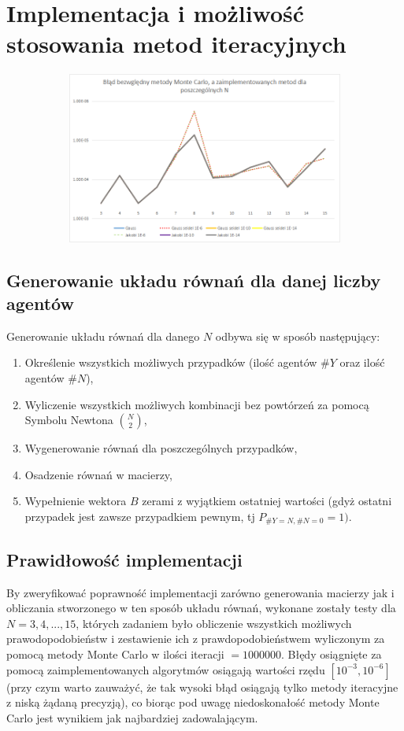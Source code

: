 \documentclass[10pt]{article}
\begin{document}
\section{Implementacja i możliwość stosowania metod iteracyjnych}
\begin{figure}[h]
	\caption{Wykres reprezentujący błąd bezwzględny metod Gaussa oraz metod iteracyjnych względem metody Monte Carlo\label{rys}}
	\centering
	\begin{subfigure}{0.5\textwidth}
		\includegraphics[width=\textwidth]{1.png}
		\caption{ \label{Rys1a}}
	\end{subfigure}
\end{figure}
\subsection{Generowanie układu równań dla danej liczby agentów}
Generowanie układu równań dla danego $N$ odbywa się w sposób następujący:
\begin{enumerate}
	\item Określenie wszystkich możliwych przypadków (ilość agentów $\#Y$ oraz ilość agentów $\#N$),
	\item Wyliczenie wszystkich możliwych kombinacji bez powtórzeń za pomocą Symbolu Newtona ${{N} \choose {2}}$,
	\item Wygenerowanie równań dla poszczególnych przypadków,
	\item Osadzenie równań w macierzy,
	\item Wypełnienie wektora $B$ zerami z wyjątkiem ostatniej wartości (gdyż ostatni przypadek jest zawsze przypadkiem pewnym, tj $P_{\#Y=N,\#N=0}=1)$.
\end{enumerate}
\subsection{Prawidłowość implementacji}
By zweryfikować poprawność implementacji zarówno generowania macierzy jak i obliczania stworzonego w ten sposób układu równań, wykonane zostały testy dla $N = 3,4,...,15$, których zadaniem było obliczenie wszystkich możliwych prawodopodobieństw i zestawienie ich z prawdopodobieństwem wyliczonym za pomocą metody Monte Carlo w ilości iteracji $=1000000$.
Błędy osiągnięte za pomocą zaimplementowanych algorytmów osiągają wartości rzędu $[10^{-3},10^{-6}]$ (przy czym warto zauważyć, że tak wysoki błąd osiągają tylko metody iteracyjne z niską żądaną precyzją), co biorąc pod uwagę niedoskonałość metody Monte Carlo jest wynikiem jak najbardziej zadowalającym.
\end{document}
